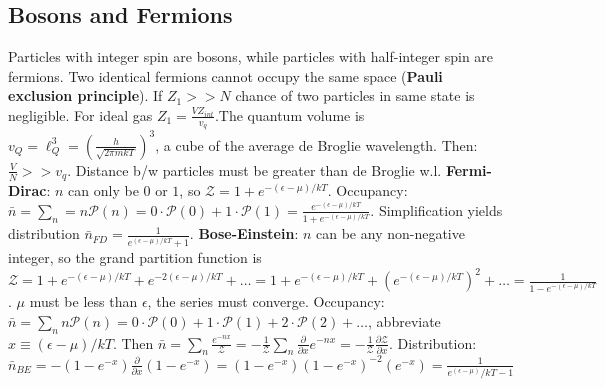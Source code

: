 \documentclass[11pt,twocolumn]{amsart}
\begin{document}
\subsection{Bosons and Fermions}
Particles with integer spin are bosons, while particles with half-integer spin are fermions. Two identical fermions cannot occupy the same space (\textbf{Pauli exclusion principle}). If $Z_1 >> N$ chance of two particles in same state is negligible. For ideal gas $Z_1 = \frac{V Z_{int}}{v_q} $.The quantum volume is $ v_Q = \ell_Q^3 = \left( \frac{h}{\sqrt{2\pi mkT}} \right)^3 $, a cube of the average de Broglie wavelength. Then: $ \frac{V}{N} >>v_q$. Distance b/w particles must be greater than de Broglie w.l.
\textbf{Fermi-Dirac}: $n$ can only be $0$ or $1$, so $\mathcal{Z} = 1 + e^{-(\epsilon-\mu)/kT}$. Occupancy: $ \bar{n} = \sum_n = n\mathcal{P}(n) = 0 \cdot \mathcal{P}(0) + 1 \cdot \mathcal{P}(1) = \frac{e^{-(\epsilon - \mu)/kT}}{1 + e^{-(\epsilon - \mu)/kT}} $. Simplification yields distribution $\bar{n}_{FD} = \frac{1}{e^{(\epsilon-\mu)/kT} + 1} $.
\textbf{Bose-Einstein}: $n$ can be any non-negative integer, so the grand partition function is $ \mathcal{Z} = 1 + e^{-(\epsilon-\mu)/kT} + e^{-2(\epsilon-\mu)/kT} + \dots = 1 + e^{-(\epsilon-\mu)/kT} + (e^{-(\epsilon-\mu)/kT})^2 + \dots = \frac{1}{1-e^{-(\epsilon-\mu)/kT}}$. $\mu$ must be less than $\epsilon$, the series must converge. Occupancy: $ \bar{n} = \sum_n n \mathcal{P}(n) = 0 \cdot \mathcal{P}(0) + 1 \cdot \mathcal{P}(1) + 2 \cdot \mathcal{P}(2) + \dots $, abbreviate $x \equiv (\epsilon-\mu)/kT$. Then $\bar{n} = \sum_n \frac{e^{-nx}}{\mathcal{Z}} = -\frac{1}{\mathcal{Z}} \sum_n \frac{\partial}{\partial x} e^{-nx} = -\frac{1}{\mathcal{Z}}\frac{\partial\mathcal{Z}}{\partial x}$. Distribution: $ \bar{n}_{BE} = -(1-e^{-x})\frac{\partial}{\partial x}(1-e^{-x}) = (1-e^{-x})(1-e^{-x})^{-2}(e^{-x}) = \frac{1}{e^(\epsilon-\mu)/kT-1} $
\end{document}

